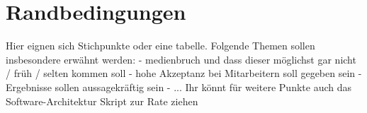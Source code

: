 \section{Randbedingungen}

Hier eignen sich Stichpunkte oder eine tabelle. Folgende Themen sollen insbesondere erwähnt werden:
- medienbruch und dass dieser möglichst gar nicht / früh / selten kommen soll 
- hohe Akzeptanz bei Mitarbeitern soll gegeben sein
- Ergebnisse sollen aussagekräftig sein
- ... Ihr könnt für weitere Punkte auch das Software-Architektur Skript zur Rate ziehen